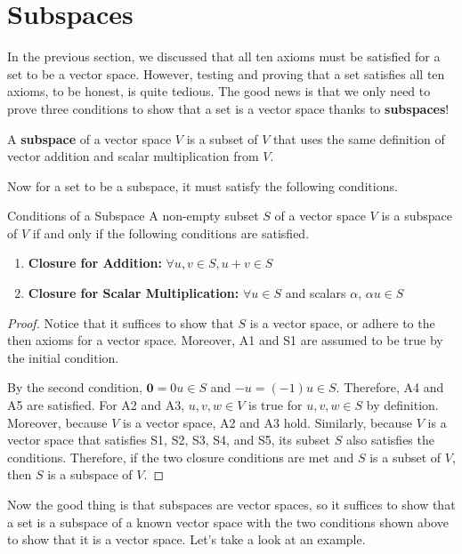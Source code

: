 \documentclass[../../main.tex]{subfiles}
\begin{document}
\section{Subspaces}

In the previous section, we discussed that all ten axioms must be
satisfied for a set to be a vector space. However, testing and
proving that a set satisfies all ten axioms, to be honest, is quite
tedious. The good news is that we only need to prove three conditions
to show that a set is a vector space thanks to \textbf{subspaces}!

\begin{definition}{}{}
A \textbf{subspace} of a vector space $V$ is a subset of $V$ that uses
the same definition of vector addition and scalar multiplication from
$V$.
\end{definition}

Now for a set to be a subspace, it must satisfy the following
conditions.

\begin{theorem}{}{Conditions of a Subspace}
A non-empty subset $S$ of a vector space $V$ is a subspace of $V$ if
and only if the following conditions are satisfied.
\begin{enumerate}[noitemsep]
\item
\textbf{Closure for Addition: }
$\forall u, v \in S, u + v \in S$
\item
\textbf{Closure for Scalar Multiplication: }
$\forall u \in S$ and scalars $\alpha$, $\alpha u \in S$
\end{enumerate}
\end{theorem}
\begin{proof}
Notice that it suffices to show that $S$ is a vector space, or adhere
to the then axioms for a vector space. Moreover, A1 and S1 are assumed
to be true by the initial condition.

By the second condition, $\mathbf{0} = 0 u \in S$ and $-u = (-1) u
\in S$. Therefore, A4 and A5 are satisfied. For A2 and A3, $u, v, w
\in V$ is true for $u, v, w \in S$ by definition. Moreover, because
$V$ is a vector space, A2 and A3 hold. Similarly, because $V$ is a
vector space that satisfies S1, S2, S3, S4, and S5, its subset $S$
also satisfies the conditions. Therefore, if the two closure
conditions are met and $S$ is a subset of $V$, then $S$ is a subspace
of $V$.
\end{proof}

Now the good thing is that subspaces are vector spaces, so it suffices
to show that a set is a subspace of a known vector space with the two
conditions shown above to show that it is a vector space. Let's take
a look at an example.
\end{document}
